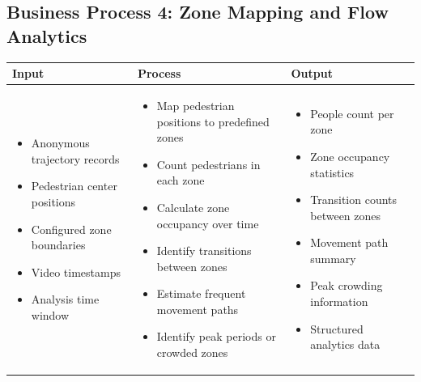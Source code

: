 \documentclass[12pt,a4paper]{report}
\begin{document}
\subsection*{Business Process 4: Zone Mapping and Flow Analytics}
\begin{longtable}{|p{4.1cm}|p{5.0cm}|p{5.0cm}|}
\hline
\rowcolor{HeaderBlue}
\textbf{Input} & \textbf{Process} & \textbf{Output} \\
\hline

\begin{itemize}[leftmargin=*, nosep]
    \item Anonymous trajectory records
    \item Pedestrian center positions
    \item Configured zone boundaries
    \item Video timestamps
    \item Analysis time window
\end{itemize}
&
\begin{itemize}[leftmargin=*, nosep]
    \item Map pedestrian positions to predefined zones
    \item Count pedestrians in each zone
    \item Calculate zone occupancy over time
    \item Identify transitions between zones
    \item Estimate frequent movement paths
    \item Identify peak periods or crowded zones
\end{itemize}
&
\begin{itemize}[leftmargin=*, nosep]
    \item People count per zone
    \item Zone occupancy statistics
    \item Transition counts between zones
    \item Movement path summary
    \item Peak crowding information
    \item Structured analytics data
\end{itemize}
\\
\hline
\end{longtable}
\end{document}
